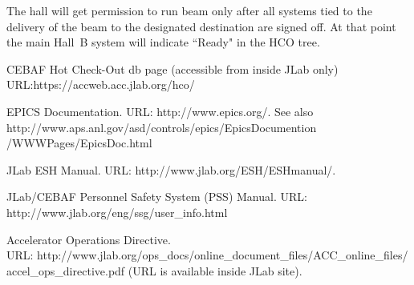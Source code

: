 \documentclass[11pt]{report}
\begin{document}
The hall will get permission to run beam only after all systems tied to the delivery of the 
beam to the designated destination are signed off. At that point the main Hall~B system will 
indicate ``Ready" in the HCO tree.

































%





\begin{thebibliography}{99}
 CEBAF Hot Check-Out db page (accessible from inside JLab only)
URL:https://accweb.acc.jlab.org/hco/

EPICS Documentation. URL: http://www.epics.org/. 
See also http://www.aps.anl.gov/asd/controls/epics/EpicsDocumention\\/WWWPages/EpicsDoc.html

JLab ESH Manual. URL: http://www.jlab.org/ESH/ESHmanual/.

JLab/CEBAF Personnel Safety System (PSS) Manual. URL: http://www.jlab.org/eng/ssg/user\_info.html

Accelerator Operations Directive. \\
URL: http://www.jlab.org/ops\_docs/online\_document\_files/ACC\_online\_files/\\accel\_ops\_directive.pdf (URL is available inside JLab site). 

\end{thebibliography}
\end{document}
